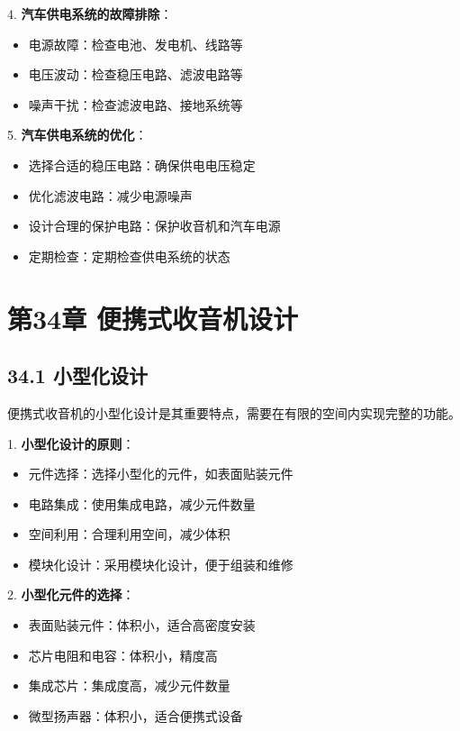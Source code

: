\documentclass[12pt,UTF8]{ctexbook}
\begin{document}
4. \textbf{汽车供电系统的故障排除}：
   \begin{itemize}[leftmargin=3.5em]
   \item 电源故障：检查电池、发电机、线路等
   \item 电压波动：检查稳压电路、滤波电路等
   \item 噪声干扰：检查滤波电路、接地系统等
   \end{itemize}

5. \textbf{汽车供电系统的优化}：
   \begin{itemize}[leftmargin=3.5em]
   \item 选择合适的稳压电路：确保供电电压稳定
   \item 优化滤波电路：减少电源噪声
   \item 设计合理的保护电路：保护收音机和汽车电源
   \item 定期检查：定期检查供电系统的状态
   \end{itemize}

\chapter*{第34章 便携式收音机设计}
\section*{34.1 小型化设计}

便携式收音机的小型化设计是其重要特点，需要在有限的空间内实现完整的功能。

1. \textbf{小型化设计的原则}：
   \begin{itemize}[leftmargin=3.5em]
   \item 元件选择：选择小型化的元件，如表面贴装元件
   \item 电路集成：使用集成电路，减少元件数量
   \item 空间利用：合理利用空间，减少体积
   \item 模块化设计：采用模块化设计，便于组装和维修
   \end{itemize}

2. \textbf{小型化元件的选择}：
   \begin{itemize}[leftmargin=3.5em]
   \item 表面贴装元件：体积小，适合高密度安装
   \item 芯片电阻和电容：体积小，精度高
   \item 集成芯片：集成度高，减少元件数量
   \item 微型扬声器：体积小，适合便携式设备
   \end{itemize}
\end{document}
